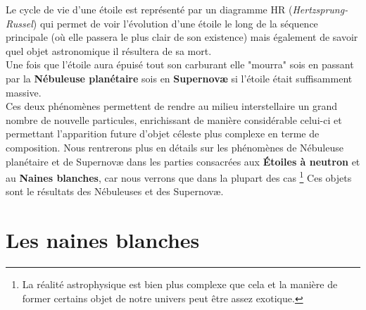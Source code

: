 \documentclass[a4paper]{rapport}
\begin{document}
Le cycle de vie d'une étoile est représenté par un diagramme HR (\textit{Hertzsprung-Russel}) qui permet de voir l'évolution d'une étoile le long de la séquence principale (où elle passera le plus clair de son existence) mais également de savoir quel objet astronomique il résultera de sa mort.\\
Une fois que l'étoile aura épuisé tout son carburant elle "mourra" sois en passant par la \textbf{Nébuleuse planétaire} sois en \textbf{Supernovæ} si l'étoile était suffisamment massive.\\
Ces deux phénomènes permettent de rendre au milieu interstellaire un grand nombre de nouvelle particules, enrichissant de manière considérable celui-ci et permettant l'apparition future d'objet céleste plus complexe en terme de composition.
\nl
Nous rentrerons plus en détails sur les phénomènes de Nébuleuse planétaire et de Supernovæ dans les parties consacrées aux \textbf{Étoiles à neutron} et au \textbf{Naines blanches}, car nous verrons que dans la plupart des cas \footnote{La réalité astrophysique est bien plus complexe que cela et la manière de former certains objet de notre univers peut être assez exotique.} Ces objets sont le résultats des Nébuleuses et des Supernovæ.

\part{Les naines blanches}
\end{document}
